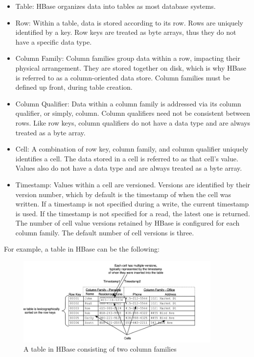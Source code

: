 \begin{itemize}
 \item Table: HBase organizes data into tables as most database systems.
 \item Row: Within a table, data is stored according to its row. Rows are uniquely identified by a key. Row keys are treated as byte arrays, thus they do not 
 have a specific data type.
 \item Column Family: Column families group data within a row, impacting their physical arrangement. They are stored together on disk, which is why 
 HBase is referred to as a column-oriented data store. Column families must be defined up front, during table creation. 
 \item Column Qualifier: Data within a column family is addressed via its column qualifier, or simply, column. Column qualifiers need not be consistent 
 between rows. Like row keys, column qualifiers do not have a data type and are always treated as a byte array.
 \item Cell: A combination of row key, column family, and column qualifier uniquely identifies a cell. The data stored in a cell is 
 referred to as that cell’s value. Values also do not have a data type and are always treated as a byte array.
 \item Timestamp: Values within a cell are versioned. Versions are identified by their version number, which by default is the timestamp of when the cell was written. 
If a timestamp is not specified during a write, the current timestamp is used. If the timestamp is not specified for a read, the latest one is returned. The number 
of cell value versions retained by HBase is configured for each column family. The default number of cell versions is three.
\end{itemize}

For example, a table in HBase can be the following:

\begin{figure}[H]
  \centering
  \includegraphics[width=0.9\textwidth]{figures/hbase.png}
  \caption{A table in HBase consisting of two column families}
\end{figure}

